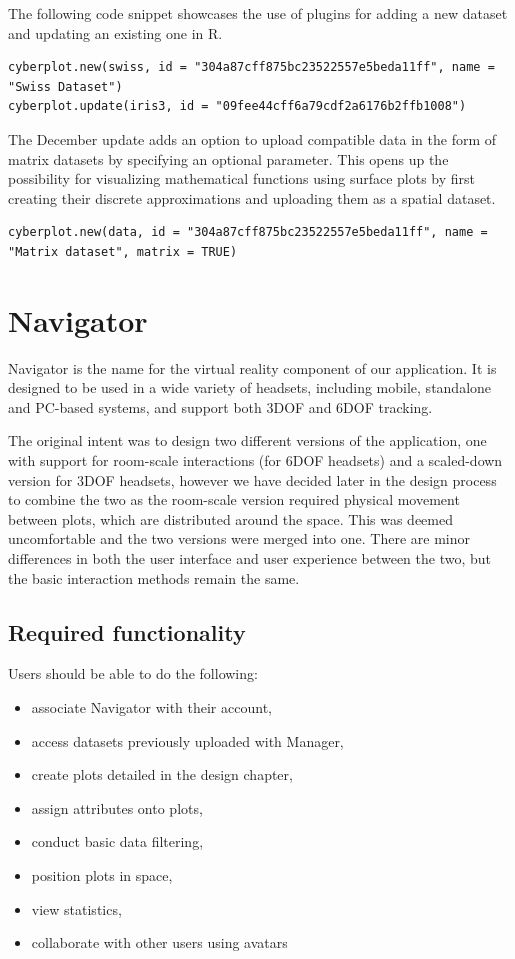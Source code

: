 \documentclass[thesis=M,english,hidelinks]{FITthesisXE}[2012/06/26]
\begin{document}
The following code snippet showcases the use of plugins for adding a new dataset and updating an existing one in R.

\begin{lstlisting}
cyberplot.new(swiss, id = "304a87cff875bc23522557e5beda11ff", name = "Swiss Dataset")
cyberplot.update(iris3, id = "09fee44cff6a79cdf2a6176b2ffb1008")
\end{lstlisting}

The December update adds an option to upload compatible data in the form of matrix datasets by specifying an optional parameter. This opens up the possibility for visualizing mathematical functions using surface plots by first creating their discrete approximations and uploading them as a spatial dataset.

\begin{lstlisting}
cyberplot.new(data, id = "304a87cff875bc23522557e5beda11ff", name = "Matrix dataset", matrix = TRUE)
\end{lstlisting}

\chapter{Navigator}

Navigator is the name for the virtual reality component of our application. It is designed to be used in a wide variety of headsets, including mobile, standalone and PC-based systems, and support both 3DOF and 6DOF tracking.

The original intent was to design two different versions of the application, one with support for room-scale interactions (for 6DOF headsets) and a scaled-down version for 3DOF headsets, however we have decided later in the design process to combine the two as the room-scale version required physical movement between plots, which are distributed around the space. This was deemed uncomfortable and the two versions were merged into one. There are minor differences in both the user interface and user experience between the two, but the basic interaction methods remain the same.

\section{Required functionality}

Users should be able to do the following:

\begin{itemize}
\item associate Navigator with their account,
\item access datasets previously uploaded with Manager,
\item create plots detailed in the design chapter,
\item assign attributes onto plots,
\item conduct basic data filtering,
\item position plots in space,
\item view statistics,
\item collaborate with other users using avatars
\end{itemize}
\end{document}
